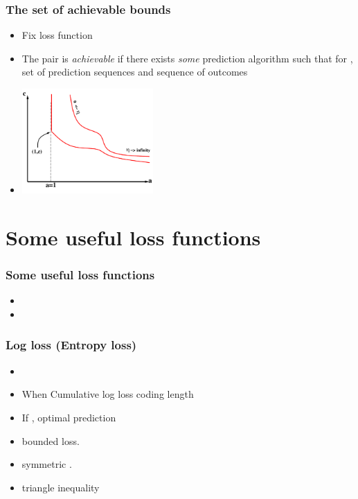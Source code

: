 \documentclass{beamer}
\begin{document}
\begin{frame}
\frametitle{The set of achievable bounds}
\begin{itemize}
\item 
Fix loss function \R{$\lambda: \Omega \times \Gamma \to [0,\infty)$}
\item
The pair  is {\em achievable} if there exists 
{\em some} prediction algorithm
such that for  ,  set of  prediction
sequences and  sequence of outcomes
\item
\begin{center}
\includegraphics[height=4cm]{figures/achievable2.pdf}
\end{center}
\end{itemize}
\end{frame}

\section{Some useful loss functions}

\begin{frame}
\frametitle{Some useful loss functions}
\begin{itemize}
\item
{}   
\item
{} 
\end{itemize}
\end{frame}

\begin{frame}
\frametitle{Log loss (Entropy loss)} 
\begin{itemize}
\item
\R{\[ \lambda_{\text{ent}}(\omega,\gamma) = \omega \ln \frac{\omega}{\gamma} 
                              +(1-\omega) \ln \frac{1-\omega}{1-\gamma} \]}
\item
When  Cumulative log loss \R{$=$} coding length 
\item
If , optimal prediction 
\item
{}bounded loss.
\item
{} symmetric .
\item
{} triangle inequality
\end{itemize}
\end{frame}
\end{document}
